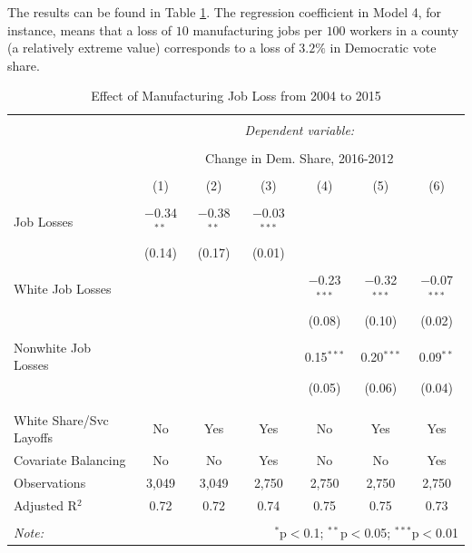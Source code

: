 \documentclass[]{AEA}
\begin{document}
The results can be found in Table \ref{regResult04}. The regression
coefficient in Model 4, for instance, means that a loss of \(10\)
manufacturing jobs per \(100\) workers in a county (a relatively extreme
value) corresponds to a loss of \(3.2 \%\) in Democratic vote share.
\FloatBarrier

\begin{table}[!htbp] \centering 
  \caption{Effect of Manufacturing Job Loss from 2004 to 2015} 
  \label{regResult04} 
\begin{tabular}{@{\extracolsep{5pt}}lcccccc} 
\\[-1.8ex]\hline 
\hline \\[-1.8ex] 
 & \multicolumn{6}{c}{\textit{Dependent variable:}} \\ 
\cline{2-7} 
\\[-1.8ex] & \multicolumn{6}{c}{Change in Dem. Share, 2016-2012} \\ 
\\[-1.8ex] & (1) & (2) & (3) & (4) & (5) & (6)\\ 
\hline \\[-1.8ex] 
 Job Losses & $-$0.34$^{**}$ & $-$0.38$^{**}$ & $-$0.03$^{***}$ &  &  &  \\ 
  & (0.14) & (0.17) & (0.01) &  &  &  \\ 
  & & & & & & \\ 
 White Job Losses &  &  &  & $-$0.23$^{***}$ & $-$0.32$^{***}$ & $-$0.07$^{***}$ \\ 
  &  &  &  & (0.08) & (0.10) & (0.02) \\ 
  & & & & & & \\ 
 Nonwhite Job Losses &  &  &  & 0.15$^{***}$ & 0.20$^{***}$ & 0.09$^{**}$ \\ 
  &  &  &  & (0.05) & (0.06) & (0.04) \\ 
  & & & & & & \\ 
\hline \\[-1.8ex] 
White Share/Svc Layoffs & No & Yes & Yes & No & Yes & Yes \\ 
Covariate Balancing & No & No & Yes & No & No & Yes \\ 
Observations & 3,049 & 3,049 & 2,750 & 2,750 & 2,750 & 2,750 \\ 
Adjusted R$^{2}$ & 0.72 & 0.72 & 0.74 & 0.75 & 0.75 & 0.73 \\ 
\hline 
\hline \\[-1.8ex] 
\textit{Note:}  & \multicolumn{6}{r}{$^{*}$p$<$0.1; $^{**}$p$<$0.05; $^{***}$p$<$0.01} \\ 
\end{tabular} 
\end{table} 
\FloatBarrier
\end{document}
